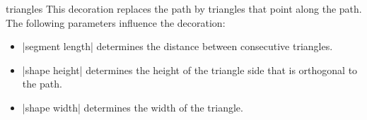 \begin{decoration}{triangles}
    This decoration replaces the path by triangles that point along the path.
    The following parameters influence the decoration:
    \begin{itemize}
        \item |segment length| determines the distance between consecutive
            triangles.
        \item |shape height| determines the height of the triangle side that is
            orthogonal to the path.
        \item |shape width| determines the width of the triangle.
    \end{itemize}
\begin{codeexample}[preamble={\usetikzlibrary{decorations.shapes}}]
\end{codeexample}
\end{decoration}

